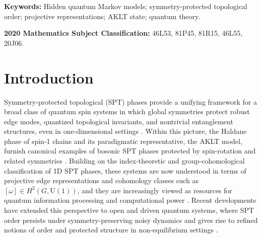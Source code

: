 \documentclass[12pt,a4paper]{article}
\begin{document}
\noindent\textbf{Keywords:} Hidden quantum Markov models; symmetry-protected topological order; projective representations;   AKLT state;   quantum theory.

\vspace{0.2cm}

\noindent\textbf{2020 Mathematics Subject Classification:} 46L53, 81P45, 81R15, 46L55, 20J06.



\section{Introduction}
Symmetry-protected topological (SPT) phases provide a unifying framework for a broad class of quantum spin systems in which global symmetries protect robust edge modes, quantized topological invariants, and nontrivial entanglement structures, even in one-dimensional settings \cite{H83,Pollmann2010,Pollmann2012}. Within this picture, the Haldane phase of spin‑1 chains and its paradigmatic representative, the AKLT model, furnish canonical examples of bosonic SPT phases protected by spin-rotation and related symmetries \cite{H83,AKLT1987,Affleck1988}. Building on the index-theoretic and group‑cohomological classification of 1D SPT phases, these systems are now understood in terms of projective edge representations and cohomology classes such as \([ \omega ] \in H^{2}(G,\mathrm{U}(1))\), and they are increasingly viewed as resources for quantum information processing and computational power \cite{O21,O23,Tas23,Chen2011a,Chen2011b,D17}. Recent developments have extended this perspective to open and driven quantum systems, where SPT order persists under symmetry-preserving noisy dynamics and gives rise to refined notions of order and protected structure in non‑equilibrium settings \cite{GTS22,D20,Sati26}.  
\end{document}
